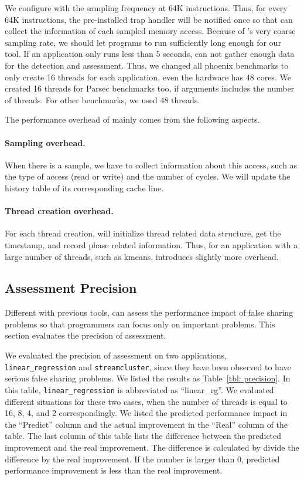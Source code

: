 We configure \cheetah{} with the sampling frequency at 64K instructions. Thus, for every 64K instructions, the pre-installed trap handler will be notified once so that \cheetah{} can collect the information of each sampled memory access. Because of \cheetah{}'s very coarse sampling rate, we should  let programs to run sufficiently long enough for our tool. If an application only runs less than 5 seconds, \cheetah{} can not gather enough data for the detection and assessment. Thus, we changed all phoenix benchmarks to only create 16 threads for each application, even the hardware has 48 cores.  We created 16 threads for Parsec benchmarks too, if arguments includes the number of threads. For other benchmarks, we used 48 threads. 

The performance overhead of \cheetah{} mainly comes from the following aspects. 
\paragraph{Sampling overhead.} When there is a sample, we have to collect information about this access, such as the type of access (read or write) and the number of cycles. We will update the history table of its corresponding cache line.

\paragraph{Thread creation overhead.} For each thread creation, \cheetah{} will initialize thread related data structure, get the timestamp, and record phase related information. Thus, for an application with a large number of threads, such as kmeans, \cheetah{} introduces slightly more overhead. 


\subsection{Assessment Precision}
\label{sec:precision}

Different with previous tools, \cheetah{} can assess the performance impact of false sharing problems so that programmers can focus only on important problems. This section evaluates the precision of assessment. 

We evaluated the precision of assessment on two applications, \texttt{linear\_regression} and \texttt{streamcluster}, since they have been observed to have serious false sharing problems. We listed the results as Table~\ref{tbl: precision}. In this table, \texttt{linear\_regression} is abbreviated as ``linear\_rg''.  We evaluated different situations for these two cases, when the number of threads is equal to 16, 8, 4, and 2 correspondingly. We listed the predicted performance impact in the ``Predict'' column and the actual improvement in the ``Real'' column of the table. The last column of this table lists the difference between the predicted improvement and the real improvement. The difference is calculated by divide the difference by the real improvement. If the number is larger than 0, predicted performance improvement is less than the real improvement.  

